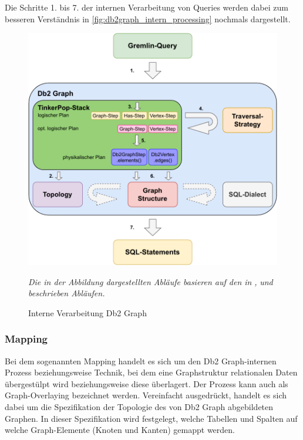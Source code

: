 Die Schritte 1. bis 7. der internen Verarbeitung von Queries werden dabei zum besseren Verständnis in \autoref{fig:db2graph_intern_processing} nochmals dargestellt.

\begin{figure}[ht]
    \centering
    \includegraphics[width=\textwidth]{images/db2graph_intern_processing.pdf}
    \caption{Interne Verarbeitung Db2 Graph}
    \label{fig:db2graph_intern_processing}
    \vspace{1em}
    \textit{Die in der Abbildung dargestellten Abläufe basieren auf den in} \cite{yt_tian}\textit{,} \cite{vldb_tian} \textit{und} \cite{sigmod_tian} \textit{beschrieben Abläufen.} 
\end{figure}

\subsubsection{Mapping}
Bei dem sogenannten Mapping handelt es sich um den Db2 Graph-internen Prozess beziehungsweise Technik, bei dem eine Graphstruktur relationalen Daten übergestülpt wird beziehungsweise diese überlagert. Der Prozess kann auch als Graph-Overlaying bezeichnet werden. Vereinfacht ausgedrückt, handelt es sich dabei um die Spezifikation der Topologie des von Db2 Graph abgebildeten Graphen. In dieser Spezifikation wird festgelegt, welche Tabellen und Spalten auf welche Graph-Elemente (Knoten und Kanten) gemappt werden. 


